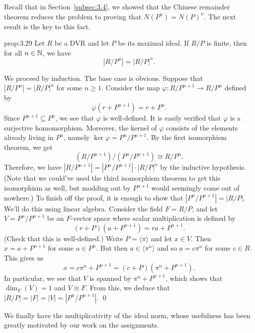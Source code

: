 Recall that in Section~\ref{subsec:3.4}, we showed that the Chinese 
remainder theorem reduces the problem to proving that 
$N(P^n) = N(P)^n$. The next result is the key to this fact. 

\begin{prop}{prop:3.29}
    Let $R$ be a DVR and let $P$ be its maximal ideal. If $R/P$ is finite, then 
    for all $n \in \mathbb{N}$, we have 
    \[ |R/P^n| = |R/P|^n. \] 
\end{prop}\vspace{-0.25cm}
\begin{pf}
    We proceed by induction. The base case is obvious. Suppose that 
    $|R/P^n| = |R/P|^n$ for some $n \geq 1$. Consider the map 
    $\varphi : R/P^{n+1} \to R/P^n$ defined by 
    \[ \varphi(r + P^{n+1}) = r + P^n. \]
    Since $P^{n+1} \subseteq P^n$, we see that $\varphi$ is well-defined. 
    It is easily verified that $\varphi$ is a surjective homomorphism. 
    Moreover, the kernel of $\varphi$ consists of the elements 
    already living in $P^n$, namely $\ker\varphi = P^n/P^{n+1}$. 
    By the first isomorphism theorem, we get 
    \[ (R/P^{n+1})/(P^n/P^{n+1}) \cong R/P^n. \] 
    Therefore, we have $|R/P^{n+1}| = |P^n/P^{n+1}| \cdot |R/P|^n$ by the 
    inductive hypothesis. (Note that we could've used the third 
    isomorphism theorem to get this isomorphism as well, but modding 
    out by $P^{n+1}$ would seemingly come out of nowhere.) 
    To finish off the proof, it is enough to show that $|P^n/P^{n+1}| 
    = |R/P|$. We'll do this using linear algebra. Consider the 
    field $F = R/P$, and let $V = P^n/P^{n+1}$ be an $F$-vector space 
    where scalar multiplication is defined by 
    \[ (r + P)(a + P^{n+1}) = ra + P^{n+1}. \] 
    (Check that this is well-defined.) Write $P = \langle \pi \rangle$ 
    and let $x \in V$. Then $x = a + P^{n+1}$ for some $a \in P^n$. 
    But then $a \in \langle \pi^n \rangle$ and so $a = c\pi^n$ for some $c \in R$. 
    This gives us 
    \[ x = c\pi^n + P^{n+1} = (c + P)(\pi^n + P^{n+1}). \] 
    In particular, we see that $V$ is spanned by $\pi^n + P^{n+1}$, which 
    shows that $\dim_F(V) = 1$ and $V \cong F$. From this, we deduce that 
    $|R/P| = |F| = |V| = |P^n/P^{n+1}|$. \qed 
\end{pf}\vspace{-0.25cm}

We finally have the multiplicativity of the ideal norm, whose usefulness 
has been greatly motivated by our work on the assignments.

